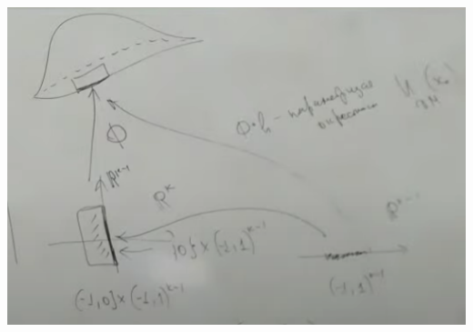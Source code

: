\begin{center}
    \includegraphics[scale=0.4]{img/extreme-points-of-extreme-points-ex1}
\end{center}

